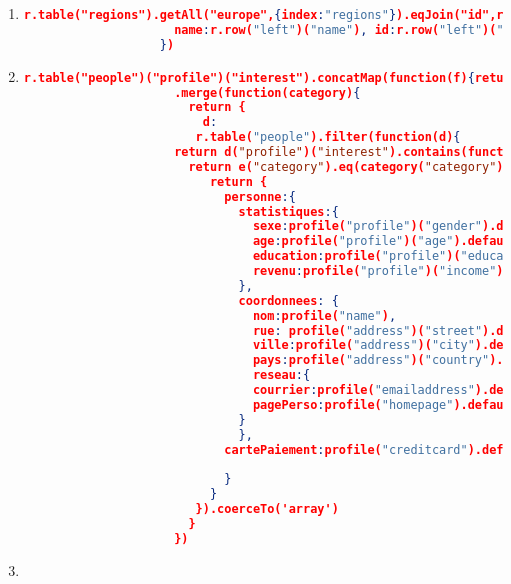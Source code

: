 \begin{enumerate}[label=Q\arabic*.]
	
    \item \label{rethink-q-9}%
	\begin{lstlisting}[language=JSON, basicstyle=\scriptsize]
	   r.table("regions").getAll("europe",{index:"regions"}).eqJoin("id",r.table("closed_auctions"),{index:"closed_itemref_item"}).map({
	                 name:r.row("left")("name"), id:r.row("left")("id"),
	               })
	\end{lstlisting}
	
	
    \item \label{rethink-q-10}%
    
	\begin{lstlisting}[language=JSON, basicstyle=\scriptsize]
	   r.table("people")("profile")("interest").concatMap(function(f){return f}).distinct()
	                 .merge(function(category){
	                   return {
	                     d:
	                    r.table("people").filter(function(d){
	                 return d("profile")("interest").contains(function(e){
	                   return e("category").eq(category("category"))})}).map(function(profile){
	                      return {
	                        personne:{
	                          statistiques:{
	                            sexe:profile("profile")("gender").default(""),
	                            age:profile("profile")("age").default(""),
	                            education:profile("profile")("education").default(""),
	                            revenu:profile("profile")("income").default("")
	                          },
	                          coordonnees: {
	                            nom:profile("name"),
	                            rue: profile("address")("street").default(""),
	                            ville:profile("address")("city").default(""),
	                            pays:profile("address")("country").default(""),
	                            reseau:{
	                            courrier:profile("emailaddress").default(""),
	                            pagePerso:profile("homepage").default("")
	                          }
	                          },
	                        cartePaiement:profile("creditcard").default("")
	   
	                        }
	                      }
	                    }).coerceTo('array')
	                   }
	                 })
	\end{lstlisting}
	
	
    \item \label{rethink-q-11}%
    

\end{enumerate}
